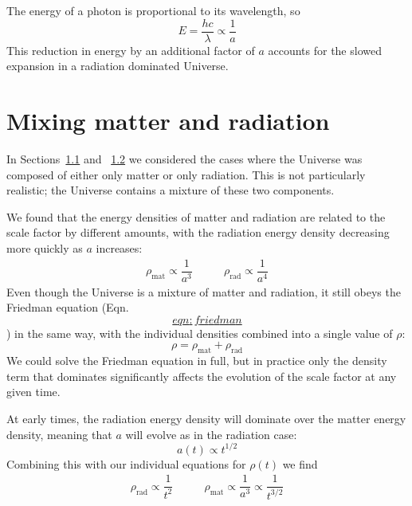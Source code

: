 \documentclass[]{book}
\begin{document}
The energy of a photon is proportional to its wavelength, so
\[E = \dfrac{h c}{\lambda} \propto \dfrac{1}{a}\] This reduction in
energy by an additional factor of \(a\) accounts for the slowed
expansion in a radiation dominated Universe.

\section{Mixing matter and radiation}\label{sec:mixtures}

In Sections~\protect\hyperlink{sec:matter_eos}{1.1} and
~\protect\hyperlink{sec:radiation_eos}{1.2} we considered the cases
where the Universe was composed of either only matter or only radiation.
This is not particularly realistic; the Universe contains a mixture of
these two components.

We found that the energy densities of matter and radiation are related
to the scale factor by different amounts, with the radiation energy
density decreasing more quickly as \(a\) increases: \[\begin{array}{lr}
    \rho_{\text{mat}} \propto \dfrac{1}{a^3} &\qquad
    \rho_{\text{rad}} \propto \dfrac{1}{a^4}
\end{array}\] Even though the Universe is a mixture of matter and
radiation, it still obeys the Friedman equation
(Eqn.~\protect\hyperlink{eqn:friedman}{\[eqn:friedman\]}) in the same
way, with the individual densities combined into a single value of
\(\rho\): \[\rho = \rho_{\text{mat}} + \rho_{\text{rad}}\] We could
solve the Friedman equation in full, but in practice only the density
term that dominates significantly affects the evolution of the scale
factor at any given time.

At early times, the radiation energy density will dominate over the
matter energy density, meaning that \(a\) will evolve as in the
radiation case: \[a(t) \propto t^{1/2}\] Combining this with our
individual equations for \(\rho(t)\) we find \[\begin{array}{lr}
\rho_{\text{rad}} \propto \dfrac{1}{t^2} & \qquad
    \rho_{\text{mat}} \propto \dfrac{1}{a^3} \propto \dfrac{1}{t^{3/2}}
\end{array}\]
\end{document}
